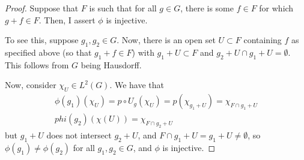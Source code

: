 \documentclass[fontsize=11pt]{scrartcl} %
\numberwithin{equation}{section} %
\numberwithin{figure}{section} %
\numberwithin{table}{section} %
\begin{document}
\begin{proof}

    Suppose that $F$ is such that for all $g\in G$, there is some $f\in F$ for
    which $g+f\in F$. Then, I assert $\phi$ is injective.

    To see this, suppose $g_1,g_2\in G$. Now, there is an open set $U\subset F$
    containing $f$ as specified above (so that $g_1+f\in F$) with $g_1+U\subset
    F$ and $g_2+U\cap g_1+U = \emptyset$. This follows from $G$ being
    Hausdorff.

    Now, consider $\chi_U\in L^2(G)$. We have that 
    \[
        \begin{aligned}
            \phi(g_1)(\chi_U) = p\circ U_g(\chi_U) =
            p(\chi_{g_1+U})=\chi_{F\cap g_1+U}\\
            phi(g_2)(\chi(U)) = \chi_{F\cap g_2+U}
        \end{aligned}
    \]
    but $g_1+U$ does not intersect $g_2+U$, and $F\cap g_1+U = g_1+U\neq
    \emptyset$, so $\phi(g_1)\neq \phi(g_2)$ for all $g_1,g_2\in G$, and $\phi$
    is injective.
\end{proof}
\end{document}
